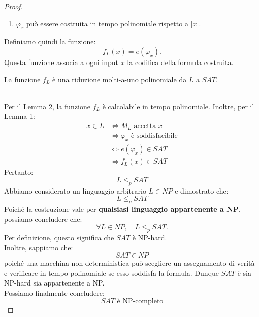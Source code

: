 \begin{proof}
\begin{enumerate}
    \item $\varphi_x$ può essere costruita
    in tempo polinomiale rispetto a $|x|$.
\end{enumerate}
Definiamo quindi la funzione:
\[
\boxed{f_L(x)=e(\varphi_x).}
\]
Questa funzione associa a ogni input $x$
la codifica della formula costruita.\smallskip\\
\colorbox{SALZO}{\parbox{\dimexpr\linewidth-2\fboxsep}{
\begin{theorem}[Lemma 3]
La funzione $f_L$ è una riduzione
molti-a-uno polinomiale da $L$ a $SAT$.
\end{theorem}
}}\smallskip\\
Per il Lemma 2, la funzione $f_L$
è calcolabile in tempo polinomiale.
Inoltre, per il Lemma 1:
\[
\begin{aligned}
x\in L
&\iff M_L\text{ accetta }x\\
&\iff \varphi_x\text{ è soddisfacibile}\\
&\iff e(\varphi_x)\in SAT\\
&\iff f_L(x)\in SAT
\end{aligned}
\]
Pertanto:
\[
\boxed{L\le_p SAT}
\]
Abbiamo considerato un linguaggio arbitrario
$L\in NP$ e dimostrato che:
\[
L\le_p SAT
\]
Poiché la costruzione vale per
\textbf{qualsiasi linguaggio appartenente a NP},
possiamo concludere che:
\[
\boxed{
\forall L\in NP,\quad L\le_p SAT.
}
\]
Per definizione, questo significa che
$SAT$ è NP-hard.\\
Inoltre, sappiamo che:
\[
SAT\in NP
\]
poiché una macchina non deterministica
può scegliere un assegnamento di verità
e verificare in tempo polinomiale
se esso soddisfa la formula.
Dunque $SAT$ è sia NP-hard sia appartenente
a NP.\smallskip\\
Possiamo finalmente concludere:
\[
\boxed{
SAT\text{ è NP-completo}
}
\]
\end{proof}

